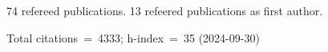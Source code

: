 74 refereed publications. 13 refeered publications as first author.

Total citations~=~4333; h-index~=~35 (2024-09-30)